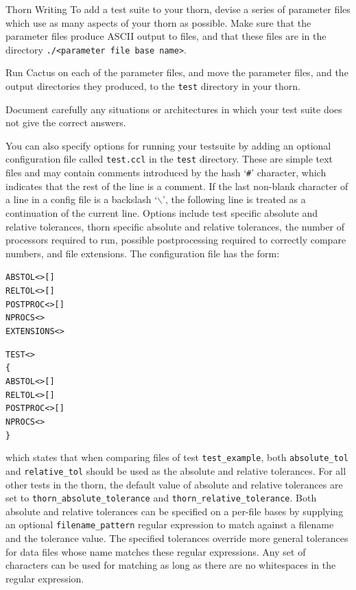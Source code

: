 \begin{cactuspart}{Thorn Writing}
To add a test suite to your thorn, devise a series of parameter
files which use as many aspects of your thorn as possible.
Make sure that the parameter files produce ASCII output to files,
and that these files are in the directory
\texttt{./<parameter file base name>}.

Run Cactus on each of the parameter files, and move the parameter files,
and the output directories they produced, to the \texttt{test} directory
in your thorn.

Document carefully any situations or architectures in which your test
suite does not give the correct answers.

You can also specify options for running your testsuite by adding an
optional configuration file called \texttt{test.ccl} in the \texttt{test}
directory. These are simple text files and may contain comments
introduced by the hash `\texttt{\#}' character, which indicates that the
rest of the line is a comment. If the last non-blank character of a
line in a config file is a backslash `\texttt{$\backslash$}', the
following line is treated as a continuation of the current line.
Options include test specific absolute and relative tolerances, thorn
specific absolute and relative tolerances, the number of processors required
to run, possible postprocessing required to correctly compare numbers,
and file extensions. The configuration file has the form:

\begin{alltt}
ABSTOL  <> []
RELTOL  <> []
POSTPROC <> []
NPROCS  <>
EXTENSIONS  <  >

TEST <>
\{
  ABSTOL <> []
  RELTOL <> []
  POSTPROC <> []
  NPROCS <>
\}
\end{alltt}

which states that when comparing files of test \verb|test_example|, both
\verb|absolute_tol| and \verb|relative_tol| should be used as
the absolute and relative tolerances. For all other tests in the
thorn, the default value of absolute and relative tolerances are set
to \verb|thorn_absolute_tolerance| and \verb|thorn_relative_tolerance|.
Both absolute and relative tolerances can be specified on a per-file
bases by supplying an optional \verb|filename_pattern| regular expression
to match against a filename and the tolerance value. The specified
tolerances override more general tolerances for data files whose name
matches these regular expressions. Any set of characters can be used for
matching as long as there are no whitespaces in the regular expression.


\end{cactuspart}
